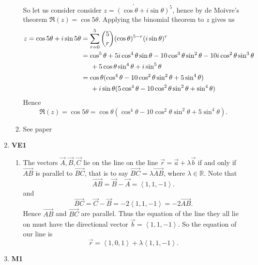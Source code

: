 \documentclass[12pt,oneside]{book}
\begin{document}
\begin{enumerate}
\begin{enumerate}
\[            .\] So let us consider consider $z = (\cos \theta + i \sin \theta)^5$, hence by de Moivre's theorem $\Re(z) = \cos 5 \theta$. Applying the binomial theorem to $z$ gives us \begin{align*}
                z = \cos 5 \theta + i \sin 5 \theta &= \sum_{r = 0}^{5} {5 \choose r} (\cos \theta)^{5 - r} (i\sin\theta)^{r} \\
                &= \cos^5 \theta + 5i \cos^4 \theta \sin \theta - 10\cos^3 \theta \sin^2 \theta - 10i \cos^2 \theta \sin^3 \theta \\
                &\hspace{5mm} + 5\cos \theta \sin^4 \theta + i \sin^5 \theta \\
                &= \cos \theta (\cos^4 \theta - 10 \cos^2 \theta \sin^2 \theta + 5 \sin^4 \theta) \\
                &\hspace{5mm} + i \sin \theta (5\cos^4 \theta - 10 \cos^2 \theta \sin^2 \theta + \sin^4 \theta)
            \end{align*} 
            Hence \[
                \Re(z) = \cos 5\theta = \cos \theta (\cos^4 \theta - 10 \cos^2 \theta \sin^2 \theta + 5 \sin^4 \theta)
            .\] 
            \item See paper 
        \end{enumerate}
        \item \textbf{VE1} \begin{enumerate}
            \item The vectors $\vec{A}, \vec{B}, \vec{C}$ lie on the line on the line $\vec{r} = \vec{a} + \lambda \vec{b}$ if and only if $\overrightarrow{AB}$ is parallel to $\overrightarrow{BC}$, that is to say $\overrightarrow{BC} = \lambda \overrightarrow{AB}$, where $\lambda \in \mathbb{R}$. Note that \[
                \overrightarrow{AB} = \vec{B} - \vec{A} = \left\langle 1, 1, -1 \right\rangle 
            .\] and \[
                \overrightarrow{BC} = \vec{C} - \vec{B} = -2\left\langle 1,1, -1 \right\rangle = -2 \overrightarrow{AB}
            .\] 
            Hence $\overrightarrow{AB}$ and $\overrightarrow{BC}$ are parallel. Thus the equation of the line they all lie on must have the directional vector $\vec{b} = \left\langle 1,1,-1 \right\rangle$. So the equation of our line is \[
                \vec{r} = \left\langle 1, 0, 1 \right\rangle + \lambda \left\langle 1,1,-1 \right\rangle
            .\] 
        \end{enumerate}
        \item \textbf{M1} \begin{enumerate}

\end{enumerate}
\end{enumerate}
\end{document}
